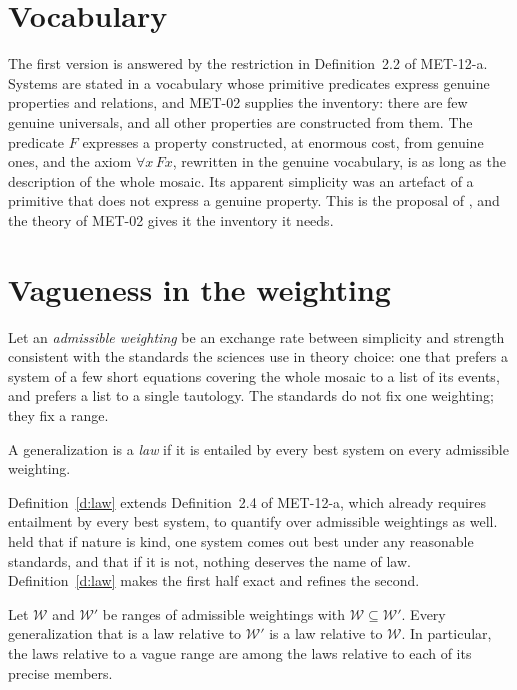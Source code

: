 \documentclass{situationist-preprint}
\begin{document}
\section{Vocabulary}

The first version is answered by the restriction in Definition~2.2 of MET-12-a. Systems are stated in a vocabulary whose primitive predicates express genuine properties and relations, and MET-02 supplies the inventory: there are few genuine universals, and all other properties are constructed from them. The predicate $F$ expresses a property constructed, at enormous cost, from genuine ones, and the axiom $\forall x\, Fx$, rewritten in the genuine vocabulary, is as long as the description of the whole mosaic. Its apparent simplicity was an artefact of a primitive that does not express a genuine property. This is the proposal of \citet{Lewis1983}, and the theory of MET-02 gives it the inventory it needs.

\section{Vagueness in the weighting}

Let an \emph{admissible weighting} be an exchange rate between simplicity and strength consistent with the standards the sciences use in theory choice: one that prefers a system of a few short equations covering the whole mosaic to a list of its events, and prefers a list to a single tautology. The standards do not fix one weighting; they fix a range.

\begin{definition}\label{d:law}
A generalization is a \emph{law} if it is entailed by every best system on every admissible weighting.
\end{definition}

Definition~\ref{d:law} extends Definition~2.4 of MET-12-a, which already requires entailment by every best system, to quantify over admissible weightings as well. \citet{Lewis1994} held that if nature is kind, one system comes out best under any reasonable standards, and that if it is not, nothing deserves the name of law. Definition~\ref{d:law} makes the first half exact and refines the second.

\begin{proposition}\label{p:fewer}
Let $\mathcal{W}$ and $\mathcal{W}'$ be ranges of admissible weightings with $\mathcal{W} \subseteq \mathcal{W}'$. Every generalization that is a law relative to $\mathcal{W}'$ is a law relative to $\mathcal{W}$. In particular, the laws relative to a vague range are among the laws relative to each of its precise members.
\end{proposition}
\end{document}

